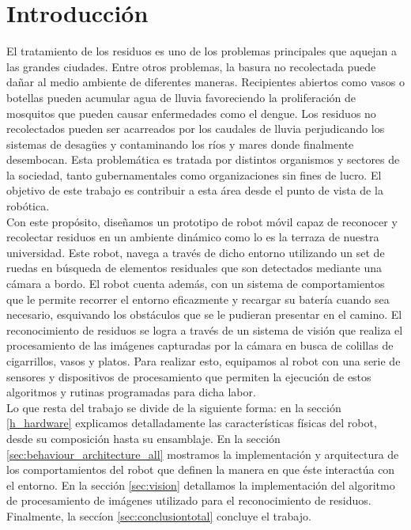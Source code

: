 
\section{\label{intro} Introducci\'on}
El tratamiento de los residuos es uno de los problemas principales que 
aquejan a las grandes ciudades. Entre otros problemas, la basura no 
recolectada puede da\~nar al medio ambiente de diferentes maneras. Recipientes
abiertos como vasos o botellas pueden acumular agua de lluvia favoreciendo la 
proliferaci\'on de mosquitos que pueden causar enfermedades como el dengue. Los
residuos no recolectados pueden ser acarreados por los caudales de lluvia
perjudicando los sistemas de desag\"ues y contaminando los r\'ios y mares donde
finalmente desembocan. Esta problem\'atica es tratada por distintos organismos
y sectores de la sociedad, tanto gubernamentales como organizaciones sin fines
de lucro. El objetivo de este trabajo es contribuir a esta \'area desde el
punto de vista de la rob\'otica.
\\\indent
Con este prop\'osito, dise\~namos un prototipo de robot m\'ovil capaz de
reconocer y recolectar residuos en un ambiente din\'amico como lo es la terraza
de nuestra universidad. Este robot, navega a trav\'es de dicho entorno
utilizando un set de ruedas en b\'usqueda de elementos residuales que
son detectados mediante una c\'amara a bordo. El robot cuenta adem\'as,
con un sistema de comportamientos que le permite recorrer el entorno
eficazmente y recargar su bater\'ia cuando sea necesario, esquivando
los obst\'aculos que se le pudieran presentar en el camino. El reconocimiento
de residuos se logra a trav\'es de un sistema de visi\'on que realiza el
procesamiento de las im\'agenes capturadas por la cámara en busca de colillas
de cigarrillos, vasos y platos. Para realizar esto, equipamos al robot con
una serie de sensores y dispositivos de procesamiento que permiten la
ejecución de estos algoritmos y rutinas programadas para dicha labor.
\\\indent
Lo que resta del trabajo se divide de la siguiente forma: en la secci\'on
\ref{h_hardware} explicamos detalladamente las caracter\'isticas f\'isicas del
robot, desde su composici\'on hasta su ensamblaje. En la secci\'on
\ref{sec:behaviour_architecture_all} mostramos la implementaci\'on y
arquitectura de los comportamientos del robot que definen la manera en que
\'este interact\'ua con el entorno. En la secci\'on \ref{sec:vision}
detallamos la implementaci\'on del algoritmo de procesamiento de im\'agenes
utilizado para el reconocimiento de residuos. Finalmente, la secc\'ion
\ref{sec:conclusiontotal} concluye el trabajo.

